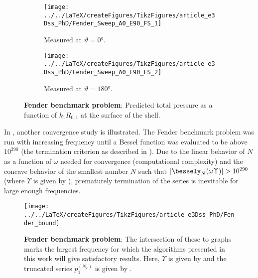 \begin{figure}
	\centering
	\begin{subfigure}[t]{\textwidth}
		\centering
		\texttt{[image: ../../LaTeX/createFigures/TikzFigures/article\_e3Dss\_PhD/Fender\_Sweep\_A0\_E90\_FS\_1]}
		\caption{Measured at $\vartheta = \ang{0}$.}
		\label{Fig1:Fender1}
	\end{subfigure}
	\par\bigskip
	\begin{subfigure}[t]{\textwidth}
		\centering
		\texttt{[image: ../../LaTeX/createFigures/TikzFigures/article\_e3Dss\_PhD/Fender\_Sweep\_A0\_E90\_FS\_2]}
		\caption{Measured at $\vartheta = \ang{180}$.}
		\label{Fig1:Fender2}
	\end{subfigure}
	\caption{\textbf{Fender benchmark problem}: Predicted total pressure as a function of $k_1R_{0,1}$ at the surface of the shell.}
\end{figure}

In , another convergence study is illustrated. The Fender benchmark problem was run with increasing frequency until a Bessel function was evaluated to be above $10^{290}$ (the termination criterion as described in ). Due to the linear behavior of $N$ as a function of $\omega$ needed for convergence (computational complexity) and the concave behavior of the smallest number $N$ such that $|\bessely_N(\omega\Upsilon)|>10^{290}$ (where $\Upsilon$ is given by ), prematurely termination of the series is inevitable for large enough frequencies.
\begin{figure}
	\centering
	\texttt{[image: ../../LaTeX/createFigures/TikzFigures/article\_e3Dss\_PhD/Fender\_bound]}
		\caption{\textbf{Fender benchmark problem}: The intersection of these to graphs marks the largest frequency for which the algorithms presented in this work will give satisfactory results. Here, $\Upsilon$ is given by  and the truncated series $p_1^{(N_\varepsilon)}$ is given by .}
	\label{Fig1:FenderConvergence}
\end{figure}


